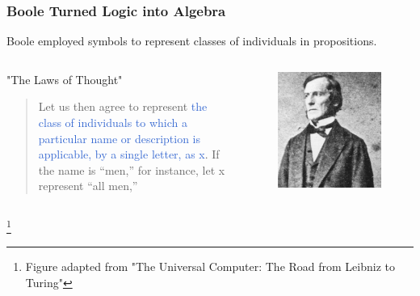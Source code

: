 \documentclass[unicode, 14pt, aspectratio=169]{beamer}
\newcommand\blfootnote[1]{%
  \begingroup
  \renewcommand\thefootnote{}\footnote{#1}%
  \addtocounter{footnote}{-1}%
  \endgroup
}
\begin{document}
\begin{frame}
  \frametitle{Boole Turned Logic into Algebra}
  {\large Boole employed symbols to represent classes of individuals in propositions.}
  \begin{columns}
    \begin{column}{0.7\textwidth}
      \begin{center}
        "The Laws of Thought"\supercite{bool}
        \begin{quotation}
          Let us then agree to represent \textcolor{highlight}{the class of individuals to which a particular name or description is applicable, by a single letter, as x}. If the name is “men,” for instance, let x represent “all men,”
        \end{quotation}
      \end{center}
    \end{column}    
    \begin{column}{0.2\textwidth}
      \begin{figure}
        \includegraphics[width=1\textwidth]{images/bool.png}
      \end{figure}       
    \end{column} 
  \end{columns}
  \blfootnote{Figure adapted from "The Universal Computer: The Road from Leibniz to Turing"}
\end{frame}
\end{document}
